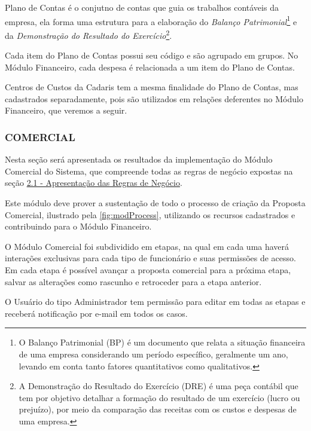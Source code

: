\documentclass[
  12pt,				%
  openany,
  oneside,
  a4paper,			%
  english,			%
  brazil
]{article}
\numberwithin{figure}{section}
\numberwithin{table}{section}
\newcounter{subsubsubsection}[subsubsection]
\begin{document}

Plano de Contas é o conjutno de contas que guia os trabalhos contáveis da empresa, ela forma uma estrutura para a elaboração do \textit{Balanço Patrimonial}\footnote{O Balanço Patrimonial (BP) é um documento que relata a situação financeira de uma empresa considerando um período específico, geralmente um ano, levando em conta tanto fatores quantitativos como qualitativos.} e da \textit{Demonstração do Resultado do Exercício}\footnote{A Demonstração do Resultado do Exercício (DRE) é uma peça contábil que tem por objetivo detalhar a formação do resultado de um exercício (lucro ou prejuízo), por meio da comparação das receitas com os custos e despesas de uma empresa.}.

Cada item do Plano de Contas possui seu código e são agrupado em grupos. No Módulo Financeiro, cada despesa é relacionada a um item do Plano de Contas.



Centros de Custos da Cadaris tem a mesma finalidade do Plano de Contas, mas cadastrados separadamente, pois são utilizados em relações deferentes no Módulo Financeiro, que veremos a seguir.


\subsubsection{COMERCIAL}
\label{sec:2.3.2}

Nesta seção será apresentada os resultados da implementação do Módulo Comercial do Sistema, que compreende todas as regras de negócio expostas na seção \hyperref[sec:2.1]{2.1 - Apresentação das Regras de Negócio}.

Este módulo deve prover a sustentação de todo o processo de criação da Proposta Comercial, ilustrado pela \autoref{fig:modProcess}, utilizando os recursos cadastrados e contribuindo para o Módulo Financeiro. 

O Módulo Comercial foi subdividido em etapas, na qual em cada uma haverá interações exclusivas para cada tipo de funcionário e suas permissões de acesso. Em cada etapa é possível avançar a proposta comercial para a próxima etapa, salvar as alterações como rascunho e retroceder para a etapa anterior. 

O Usuário do tipo Administrador tem permissão para editar em todas as etapas e receberá notificação por e-mail em todos os casos.


\end{document}
